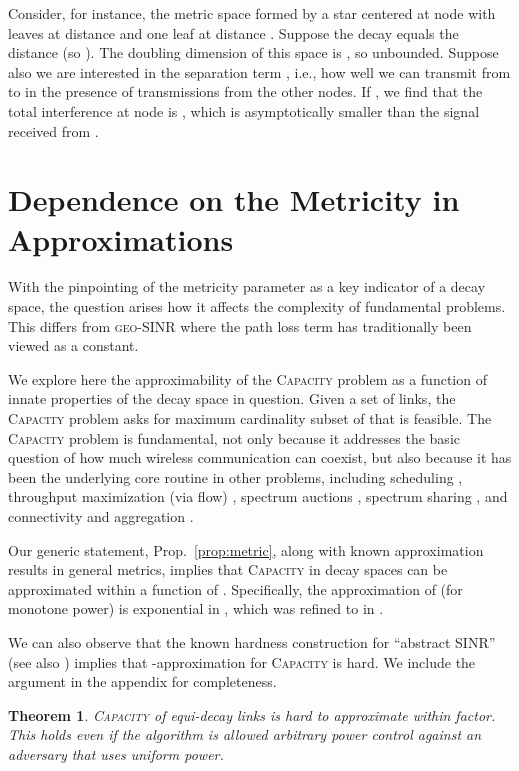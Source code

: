 \documentclass[11pt]{amsart}
\newcounter{foo}
\newtheorem{theorem}[foo]{Theorem}
\newcommand{\prob}[1]{\textsc{#1}}
\newcommand{\Capacity}{\prob{Capacity}}
\newcommand{\capacity}{\Capacity}
\newcommand{\geomodel}{\textsc{geo-SINR}}
\begin{document}
Consider, for instance, the metric space formed by a star centered at
node  with  leaves  at distance 
 and one leaf  at distance .  Suppose the
decay  equals the distance (so ).  The doubling
dimension of this space is , so unbounded.  Suppose also we are
interested in the separation term , i.e., how well we can transmit
from  to  in the presence of transmissions from the other
nodes. If , we find that the total interference at node
 is , which is asymptotically
smaller than the signal received from .



\section{Dependence on the Metricity in Approximations}
\label{sec:dependence}

With the pinpointing of the metricity parameter  as a key 
indicator of a decay space, the question
arises how it affects the complexity of fundamental problems. 
This differs from {\geomodel} where the path loss term
 has traditionally been viewed as a constant.



We explore here the approximability of the {\capacity} problem as a
function of innate properties of the decay space in question.
Given a set  of links, the {\capacity} problem asks for 
maximum cardinality subset
of  that is feasible.
The {\capacity} problem is fundamental, not only because it addresses
the basic question of how much wireless communication
can coexist, but also because it has been the underlying core routine
in other problems, including scheduling \cite{GHWW09}, throughput maximization (via
flow) \cite{wanwireless}, spectrum auctions \cite{hoeferspaa}, spectrum sharing \cite{us:Infocom12}, and connectivity and aggregation \cite{SODA12,PODC12}.

Our generic statement, Prop.~\ref{prop:metric}, along with known
approximation results \cite{SODA11,KesselheimESA12} in general metrics, 
implies that {\capacity} in decay spaces can be approximated
within a function of . Specifically, the
approximation of \cite{SODA11} (for monotone power) is exponential in , 
which was refined to  in \cite{us:ICDCS14}.

We can also observe that the known hardness construction for
``abstract SINR'' \cite{GHWW09} (see also \cite{SODA11}) implies that
-approximation for {\capacity} is hard.  We include
the argument in the appendix for completeness.

\begin{theorem}
 \prob{Capacity} of equi-decay links is hard to approximate within  factor.
This holds even if the algorithm is allowed 
arbitrary power control against an adversary that uses uniform power.
\label{thm:cap-hardness}
\end{theorem}
\end{document}
